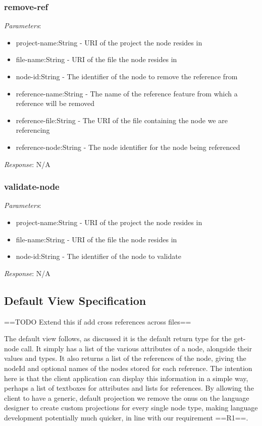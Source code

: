 \documentclass{article}
\begin{document}
\subsubsection{remove-ref}
\emph{Parameters}: 
\begin{itemize}
\item project-name:String - URI of the project the node resides in
\item file-name:String - URI of the file the node resides in
\item node-id:String - The identifier of the node to remove the reference from
\item reference-name:String - The name of the reference feature from which a reference will be removed
\item reference-file:String - The URI of the file containing the node we are referencing
\item reference-node:String - The node identifier for the node being referenced
\end{itemize}
\emph{Response}: N/A

\subsubsection{validate-node}

\emph{Parameters}: 
\begin{itemize}
\item project-name:String - URI of the project the node resides in
\item file-name:String - URI of the file the node resides in
\item node-id:String - The identifier of the node to validate
\end{itemize}
\emph{Response}: N/A

\subsection{Default View Specification}
==TODO Extend this if add cross references across files==

The default view follows, as discussed it is the default return type for the get-node call. It simply has a list of the various attributes of a node, alongside their values and types. It also returns a list of the references of the node, giving the nodeId and optional names of the nodes stored for each reference. The intention here is that the client application can display this information in a simple way, perhaps a list of textboxes for attributes and lists for references. By allowing the client to have a generic, default projection we remove the onus on the language designer to create custom projections for every single node type, making language development potentially much quicker, in line with our requirement ==R1==.

\end{document}
